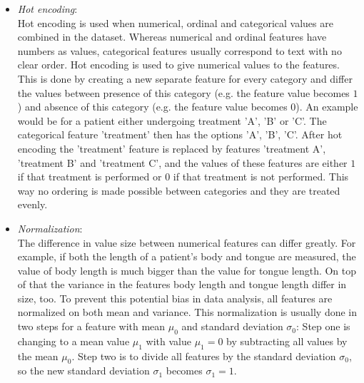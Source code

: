 \documentclass[10pt,a4paper]{article}
\begin{document}
	\begin{itemize}
		\item \textit{Hot encoding}:\\
		Hot encoding is used when numerical, ordinal and categorical values are combined in the dataset. Whereas numerical and ordinal features have numbers as values, categorical features usually correspond to text with no clear order. Hot encoding is used to give numerical values to the features. This is done by creating a new separate feature for every category and differ the values between presence of this category (e.g. the feature value becomes $1$) and absence of this category (e.g. the feature value becomes $0$). An example would be for a patient either undergoing treatment 'A', 'B' or 'C'. The categorical feature 'treatment' then has the options {'A', 'B', 'C'}. After hot encoding the 'treatment' feature is replaced by features 'treatment A', 'treatment B' and 'treatment C', and the values of these features are either $1$ if that treatment is performed or $0$ if that treatment is not performed. This way no ordering is made possible between categories and they are treated evenly.
		\item \textit{Normalization}:\\
		The difference in value size between numerical features can differ greatly. For example, if both the length of a patient's body and tongue are measured, the value of body length is much bigger than the value for tongue length. On top of that the variance in the features body length and tongue length differ in size, too. To prevent this potential bias in data analysis, all features are normalized on both mean and variance. This normalization is usually done in two steps for a feature with mean $\mu_0$ and standard deviation $\sigma_0$: Step one is changing to a mean value $\mu_1$ with value $\mu_1 = 0$ by subtracting all values by the mean $\mu_0$. Step two is to divide all features by the standard deviation $\sigma_0$, so the new standard deviation $\sigma_1$ becomes $\sigma_1 = 1$.
	\end{itemize}
\end{document}
